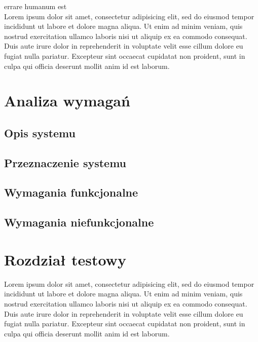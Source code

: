 \documentclass[a4paper,titlepage,twoside,openright]{report} %
\begin{document}
	
			
	\tableofcontents
	\newpage
	

	
		errare humanum est\\
	
		Lorem ipsum dolor sit amet, consectetur adipisicing elit, sed do eiusmod tempor incididunt 
		ut labore et dolore magna aliqua. Ut enim ad 	minim veniam, quis nostrud exercitation 
		ullamco laboris nisi ut aliquip ex ea commodo consequat. Duis aute irure dolor in reprehenderit 
		in voluptate velit esse cillum dolore eu fugiat nulla pariatur. Excepteur sint occaecat 
		cupidatat non proident, sunt in culpa qui officia deserunt mollit anim id est laborum.

	
	\chapter{Analiza wymagań}
		
		\section{Opis systemu}
		\section{Przeznaczenie systemu}
		\section{Wymagania funkcjonalne}
		\section{Wymagania niefunkcjonalne}
		
	\cleardoublepage
	\pagestyle{fancy}	
	
	\chapter{Rozdział testowy}	
	
		Lorem ipsum dolor sit amet, consectetur adipisicing elit, sed do eiusmod tempor incididunt 
		ut labore et dolore magna aliqua. Ut enim ad 	minim veniam, quis nostrud exercitation 
		ullamco laboris nisi ut aliquip ex ea commodo consequat. Duis aute irure dolor in reprehenderit 
		in voluptate velit esse cillum dolore eu fugiat nulla pariatur. Excepteur sint occaecat 
		cupidatat non proident, sunt in culpa qui officia deserunt mollit anim id est laborum.
		
\end{document}

